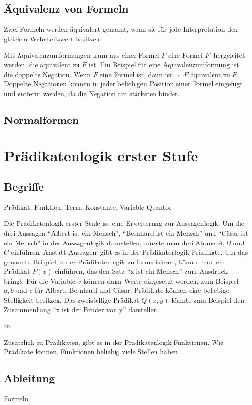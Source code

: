 \subsection{Äquivalenz von Formeln}
Zwei Formeln werden äquivalent genannt, wenn sie für jede Interpretation den gleichen Wahrheitswert besitzen.

Mit Äquivalenzumformungen kann aus einer Formel $F$ eine Formel $F'$ hergeleitet werden, die äquivalent zu $F$ ist. Ein Beispiel für eine Äquivalenzumformung ist die doppelte Negation. Wenn $F$ eine Formel ist, dann ist $\neg\neg F$ äquivalent zu $F$. Doppelte Negationen können in jeder beliebigen Position einer Formel eingefügt und entfernt werden, da die Negation am stärksten bindet.

\subsection{Normalformen}\label{section:Normalformen}

	\section{Prädikatenlogik erster Stufe}
		\subsection{Begriffe}
Prädikat, Funktion, Term, Konstante, Variable
Quantor

Die Prädikatenlogik erster Stufe ist eine Erweiterung zur Aussagenlogik. Um die drei Aussagen "`Albert ist ein Mensch"', "`Bernhard ist ein Mensch"' und "`Cäsar ist ein Mensch"' in der Aussagenlogik dazustellen, müsste man drei Atome $A, B$ und $C$ einführen. Anstatt Aussagen, gibt es in der Prädikatenlogik Prädikate. Um das genannte Beispiel in der Prädikatenlogik zu formalisieren, könnte man ein Prädikat $P(x)$ einführen, das den Satz "`x ist ein Mensch"' zum Ausdruck bringt. Für die Variable $x$ können dann Werte eingesetzt werden, zum Beispiel $a, b$ und $c$ für Albert, Bernhard und Cäsar. 
Prädikate können eine beliebige Stelligkeit besitzen. Das zweistellige Prädikat $Q(x,y)$ könnte zum Beispiel den Zusammenhang "`x ist der Bruder von y"' darstellen.

In 

Zusätzlich zu Prädikaten, gibt es in der Prädikatenlogik Funktionen. Wie Prädikate können, Funktionen beliebig viele Stellen haben.

		\subsection{Ableitung}
Formeln 
